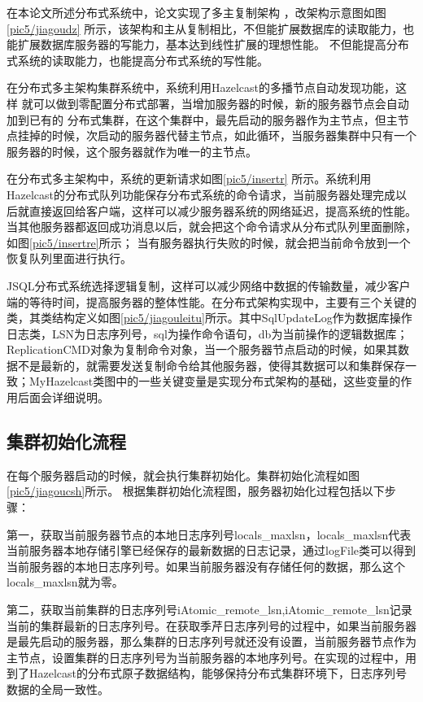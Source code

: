 在本论文所述分布式系统中，论文实现了多主复制架构
，改架构示意图如图\ref{pic5/jiagoudz}
所示，该架构和主从复制相比，不但能扩展数据库的读取能力，也能扩展数据库服务器的写能力，基本达到线性扩展的理想性能。
不但能提高分布式系统的读取能力，也能提高分布式系统的写性能。

在分布式多主架构集群系统中，系统利用Hazelcast的多播节点自动发现功能，这样
就可以做到零配置分布式部署，当增加服务器的时候，新的服务器节点会自动加到已有的
分布式集群，在这个集群中，最先启动的服务器作为主节点，但主节点挂掉的时候，次启动的服务器代替主节点，如此循环，当服务器集群中只有一个服务器的时候，这个服务器就作为唯一的主节点。

在分布式多主架构中，系统的更新请求如图\ref{pic5/insertr}
所示。系统利用Hazelcast的分布式队列功能保存分布式系统的命令请求，当前服务器处理完成以后就直接返回给客户端，这样可以减少服务器系统的网络延迟，提高系统的性能。当其他服务器都返回成功消息以后，就会把这个命令请求从分布式队列里面删除，如图\ref{pic5/insertre}所示；
当有服务器执行失败的时候，就会把当前命令放到一个恢复队列里面进行执行。

JSQL分布式系统选择逻辑复制，这样可以减少网络中数据的传输数量，减少客户端的等待时间，提高服务器的整体性能。在分布式架构实现中，主要有三个关键的类，其类结构定义如图\ref{pic5/jiagouleitu}所示。其中SqlUpdateLog作为数据库操作日志类，LSN为日志序列号，sql为操作命令语句，db为当前操作的逻辑数据库；ReplicationCMD对象为复制命令对象，当一个服务器节点启动的时候，如果其数据不是最新的，就需要发送复制命令给其他服务器，使得其数据可以和集群保存一致；MyHazelcast类图中的一些关键变量是实现分布式架构的基础，这些变量的作用后面会详细说明。
\subsection{集群初始化流程}
在每个服务器启动的时候，就会执行集群初始化。集群初始化流程如图
\ref{pic5/jiagoucsh}所示。
根据集群初始化流程图，服务器初始化过程包括以下步骤：

第一，获取当前服务器节点的本地日志序列号locals\_maxlsn，locals\_maxlsn代表当前服务器本地存储引擎已经保存的最新数据的日志记录，通过logFile类可以得到当前服务器的本地日志序列号。如果当前服务器没有存储任何的数据，那么这个locals\_maxlsn就为零。

第二，获取当前集群的日志序列号iAtomic\_remote\_lsn,iAtomic\_remote\_lsn记录当前的集群最新的日志序列号。在获取季芹日志序列号的过程中，如果当前服务器是最先启动的服务器，那么集群的日志序列号就还没有设置，当前服务器节点作为主节点，设置集群的日志序列号为当前服务器的本地序列号。在实现的过程中，用到了Hazelcast的分布式原子数据结构，能够保持分布式集群环境下，日志序列号数据的全局一致性。

